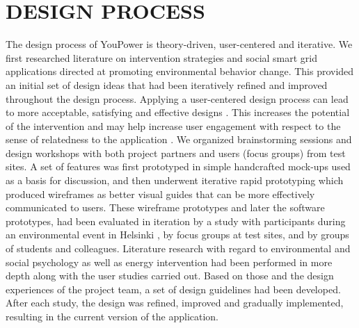 

\section{\uppercase{Design Process}}

The design process of YouPower is theory-driven, user-centered and iterative. We first researched literature on intervention strategies and social smart grid applications directed at promoting environmental behavior change. This provided an initial set of design ideas that had been iteratively refined and improved throughout the design process. 
% 
Applying a user-centered design process can lead to more acceptable, satisfying and effective designs \cite{Brynjarsdottir2012}. This increases the potential of the intervention and may help increase user engagement with respect to the sense of relatedness to the application \cite{dick2012empowering,Pierce2012,schwartz2015people, edward2015review}. 
% 
We organized brainstorming sessions and design workshops with both project partners and users (focus groups) from test sites. A set of features was first prototyped in simple handcrafted mock-ups used as a basis for discussion, and then underwent iterative rapid prototyping which produced wireframes as better visual guides that can be more effectively communicated to users. These wireframe prototypes and later the software prototypes, had been evaluated in iteration by a study with participants during an environmental event in Helsinki \cite{Barssi2015}, by focus groups at test sites, and by groups of students and colleagues. 
% 
Literature research with regard to environmental and social psychology as well as energy intervention had been performed in more depth along with the user studies carried out. Based on those and  the design experiences of the project team, a set of design guidelines had been developed. 
After each study, the design was refined, improved and gradually implemented, resulting in the current version of the application. 


